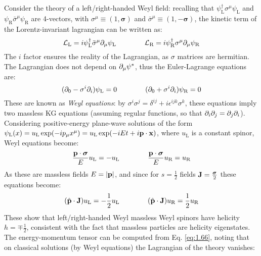 Consider the theory of a left/right-handed Weyl field: recalling that $ \psi_\text{L}^\dagger \sigma^\mu \psi_\text{L} $ and $ \psi_\text{R} \bar{\sigma}^\mu \psi_\text{R} $ are 4-vectors, with $ \sigma^\mu \equiv (1, \boldsymbol{\sigma}) $ and $ \bar{\sigma}^\mu \equiv (1, - \boldsymbol{\sigma}) $, the kinetic term of the Lorentz-invariant lagrangian can be written as:
\begin{equation}
  \mathcal{L}_\text{L} = i \psi_\text{L}^\dagger \bar{\sigma}^\mu \partial_\mu \psi_\text{L}
  \qquad \qquad
  \mathcal{L}_\text{R} = i \psi_\text{R}^\dagger \sigma^\mu \partial_\mu \psi_\text{R}
  \label{eq:1.80}
\end{equation}
The $ i $ factor ensures the reality of the Lagrangian, as $ \sigma $ matrices are hermitian. The Lagrangian does not depend on $ \partial_\mu \psi^* $, thus the Euler-Lagrange equations are:
\begin{equation}
  (\partial_0 - \sigma^i \partial_i) \psi_\text{L} = 0
  \qquad \qquad
  (\partial_0 + \sigma^i \partial_i) \psi_\text{R} = 0
  \label{eq:1.81}
\end{equation}
These are known as \textit{Weyl equations}: by $ \sigma^i \sigma^j = \delta^{ij} + i \epsilon^{ijk} \sigma^k $, these equations imply two massless KG equations (assuming regular functions, so that $ \partial_i \partial_j = \partial_j \partial_i $). Considering positive-energy plane-wave solutions of the form $ \psi_\text{L}(x) = u_\text{L} \exp(-i p_\mu x^\mu) = u_\text{L} \exp(-i E t + i \mathbf{p} \cdot \mathbf{x}) $, where $ u_\text{L} $ is a constant spinor, Weyl equations become:
\begin{equation*}
  \frac{\mathbf{p} \cdot \boldsymbol{\sigma}}{E} u_\text{L} = - u_\text{L}
  \qquad \qquad
  \frac{\mathbf{p} \cdot \boldsymbol{\sigma}}{E} u_\text{R} = u_\text{R}
\end{equation*}
As these are massless fields $ E = \left\lvert\mathbf{p}\right\rvert $, and since for $ s = \frac{1}{2} $ fields $ \mathbf{J} = \frac{\boldsymbol{\sigma}}{2} $ these equations become:
\begin{equation*}
  (\hat{\mathbf{p}} \cdot \mathbf{J}) u_\text{L} = - \frac{1}{2} u_\text{L}
  \qquad \qquad
  (\hat{\mathbf{p}} \cdot \mathbf{J}) u_\text{R} = \frac{1}{2} u_\text{R}
\end{equation*}
These show that left/right-handed Weyl massless Weyl spinors have helicity $ h = \mp \frac{1}{2} $, consistent with the fact that massless particles are helicity eigenstates.\\
The energy-momentum tensor can be computed from Eq. \ref{eq:1.66}, noting that on classical solutions (by Weyl equations) the Lagrangian of the theory vanishes:
